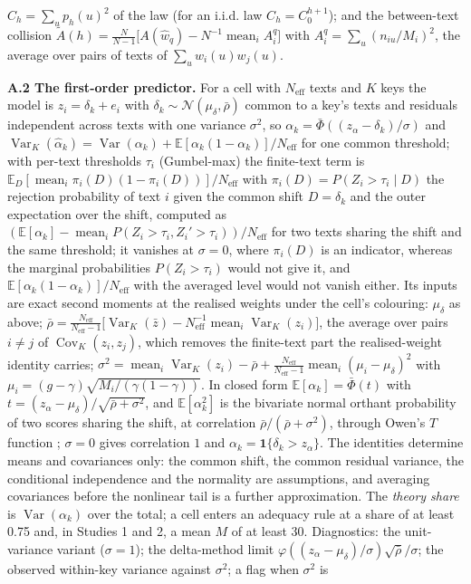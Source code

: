 \documentclass[11pt,letterpaper]{article}
\begin{document}
\(C_h = \sum_u p_h(u)^2\) of the law (for an i.i.d. law \(C_h = C_0^{h+1}\)); and the between-text collision \(\tilde A(h) = \frac{N}{N-1}\bigl[A(\hat w_q) - N^{-1}\operatorname{mean}_i A_i^q\bigr]\) with \(A_i^q = \sum_u (n_{iu}/M_i)^2\), the average over pairs of texts of \(\sum_u w_i(u) w_j(u)\).

\textbf{A.2 The first-order predictor.} For a cell with \(N_{\mathrm{eff}}\) texts and \(K\) keys the model is \(z_i = \delta_k + e_i\) with \(\delta_k \sim \mathcal N(\mu_\delta, \bar\rho)\) common to a key's texts and residuals independent across texts with one variance \(\sigma^2\), so \(\alpha_k = \bar\Phi((z_\alpha - \delta_k)/\sigma)\) and \(\operatorname{Var}_K(\hat\alpha_k) = \operatorname{Var}(\alpha_k) + \mathbb{E}[\alpha_k(1-\alpha_k)]/N_{\mathrm{eff}}\) for one common threshold; with per-text thresholds \(\tau_i\) (Gumbel-max) the finite-text term is \(\mathbb{E}_D[\operatorname{mean}_i \pi_i(D)(1-\pi_i(D))]/N_{\mathrm{eff}}\) with \(\pi_i(D) = P(Z_i > \tau_i \mid D)\) the rejection probability of text \(i\) given the common shift \(D = \delta_k\) and the outer expectation over the shift, computed as \((\mathbb{E}[\alpha_k] - \operatorname{mean}_i P(Z_i > \tau_i, Z_i' > \tau_i))/N_{\mathrm{eff}}\) for two texts sharing the shift and the same threshold; it vanishes at \(\sigma = 0\), where \(\pi_i(D)\) is an indicator, whereas the marginal probabilities \(P(Z_i > \tau_i)\) would not give it, and \(\mathbb{E}[\alpha_k(1-\alpha_k)]/N_{\mathrm{eff}}\) with the averaged level would not vanish either. Its inputs are exact second moments at the realised weights under the cell's colouring: \(\mu_\delta\) as above; \(\bar\rho = \frac{N_{\mathrm{eff}}}{N_{\mathrm{eff}}-1}\bigl[\operatorname{Var}_K(\bar z) - N_{\mathrm{eff}}^{-1}\operatorname{mean}_i \operatorname{Var}_K(z_i)\bigr]\), the average over pairs \(i \ne j\) of \(\operatorname{Cov}_K(z_i, z_j)\), which removes the finite-text part the realised-weight identity carries; \(\sigma^2 = \operatorname{mean}_i \operatorname{Var}_K(z_i) - \bar\rho + \frac{N_{\mathrm{eff}}}{N_{\mathrm{eff}}-1}\operatorname{mean}_i(\mu_i - \mu_\delta)^2\) with \(\mu_i = (g-\gamma)\sqrt{M_i/(\gamma(1-\gamma))}\). In closed form \(\mathbb{E}[\alpha_k] = \bar\Phi(t)\) with \(t = (z_\alpha - \mu_\delta)/\sqrt{\bar\rho + \sigma^2}\), and \(\mathbb{E}[\alpha_k^2]\) is the bivariate normal orthant probability of two scores sharing the shift, at correlation \(\bar\rho/(\bar\rho + \sigma^2)\), through Owen's \(T\) function \citep{owen1956tables}; \(\sigma = 0\) gives correlation \(1\) and \(\alpha_k = \mathbf 1\{\delta_k > z_\alpha\}\). The identities determine means and covariances only: the common shift, the common residual variance, the conditional independence and the normality are assumptions, and averaging covariances before the nonlinear tail is a further approximation. The \emph{theory share} is \(\operatorname{Var}(\alpha_k)\) over the total; a cell enters an adequacy rule at a share of at least 0.75 and, in Studies 1 and 2, a mean \(M\) of at least 30. Diagnostics: the unit-variance variant (\(\sigma = 1\)); the delta-method limit \(\varphi((z_\alpha - \mu_\delta)/\sigma)\sqrt{\bar\rho}/\sigma\); the observed within-key variance against \(\sigma^2\); a flag when \(\sigma^2\) is 
\end{document}
